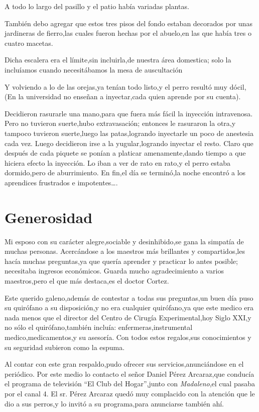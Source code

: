 \documentclass[letterpaper,12pt]{book}
\begin{document}
A todo lo largo del pasillo y el patio había variadas plantas. 

También debo agregar que estos tres pisos del fondo estaban decorados por unas jardineras de fierro,las cuales fueron hechas por el abuelo,en las que había tres o cuatro macetas. 

Dicha escalera era el límite,sin incluirla,de nuestra área domestica; solo la incluíamos cuando necesitábamos la mesa de auscultación

Y volviendo a lo de las orejas,ya tenían todo listo,y el perro resultó muy dócil,(En la universidad no enseñan a inyectar,cada quien aprende por su cuenta).

Decidieron rasurarle una mano,para que fuera más fácil la inyección intravenosa. Pero no tuvieron suerte,hubo extravasación; entonces le rasuraron la otra,y tampoco tuvieron suerte,luego las patas,logrando inyectarle un poco de anestesia cada vez. Luego decidieron  irse a la yugular,logrando inyectar el resto. Claro que después de cada piquete se ponían a platicar amenamente,dando tiempo a que hiciera efecto la inyección. Lo iban a ver de rato en rato,y el perro estaba dormido,pero de aburrimiento. En fin,el día se terminó,la noche encontró a los aprendices frustrados e impotentes\ldots.
\chapter{Generosidad}
Mi esposo con su carácter alegre,sociable y desinhibido,se gana la simpatía de muchas personas. Acercándose a los maestros más brillantes y compartidos,les hacía muchas preguntas,ya que quería aprender y practicar lo antes posible; necesitaba ingresos económicos. Guarda mucho agradecimiento a varios maestros,pero el que más destaca,es el doctor Cortez.

Este querido galeno,además de contestar a todas sus preguntas,un buen día puso su quirófano a su disposición,y no era cualquier quirófano,ya que este medico era nada menos que el director del Centro de Cirugía Experimental,hoy Siglo XXI,y no sólo el quirófano,también incluía: enfermeras,instrumental medico,medicamentos,y su asesoría. Con todos estos regalos,sus conocimientos y su seguridad subieron como la espuma.

Al contar con este gran respaldo,pudo ofrecer sus servicios,anunciándose en el periódico. Por este medio lo contacto el señor Daniel Pérez Arcaraz,que conducía el programa de televisión ``El Club del Hogar'',junto con {\it Madaleno},el cual pasaba por el canal 4. El sr. Pérez Arcaraz quedó muy complacido con la atención que le dio a sus perros,y lo invitó a su programa,para anunciarse también ahí. 
\end{document}
